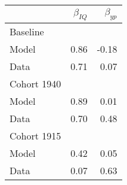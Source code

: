 \begin{tabular}{lrr}
\hline
  & $\beta_{IQ}$  & $\beta_{yp}$  \\
\hline
Baseline &   &   \\
Model & 0.86  & -0.18  \\
Data & 0.71  & 0.07  \\
Cohort 1940 &   &   \\
Model & 0.89  & 0.01  \\
Data & 0.70  & 0.48  \\
Cohort 1915 &   &   \\
Model & 0.42  & 0.05  \\
Data & 0.07  & 0.63  \\
\hline
\end{tabular}%
